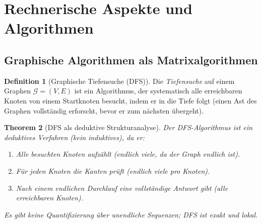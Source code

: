 \documentclass[12pt, a4paper]{article}
\newtheorem{theorem}{Theorem}[section]
\theoremstyle{definition}
\newtheorem{definition}[theorem]{Definition}
\theoremstyle{remark}
\newcommand{\Graph}{\mathcal{G}}
\begin{document}
\section{Rechnerische Aspekte und Algorithmen}
\label{sec:algorithmen}

\subsection{Graphische Algorithmen als Matrixalgorithmen}
\label{subsec:graphische_algorithmen}

\begin{definition}[Graphische Tiefensuche (DFS)]
\label{def:dfs}
Die \emph{Tiefensuche} auf einem Graphen $\Graph = (V, E)$ ist ein Algorithmus, der systematisch alle erreichbaren Knoten von einem Startknoten besucht, indem er in die Tiefe folgt (einen Ast des Graphen vollständig erforscht, bevor er zum nächsten übergeht).
\end{definition}

\begin{theorem}[DFS als deduktive Strukturanalyse]
\label{thm:dfs_deduktiv}
Der DFS-Algorithmus ist ein deduktives Verfahren (kein induktives), da er:
\begin{enumerate}[label=(\alph*)]
  \item Alle besuchten Knoten aufzählt (endlich viele, da der Graph endlich ist).
  \item Für jeden Knoten die Kanten prüft (endlich viele pro Knoten).
  \item Nach einem endlichen Durchlauf eine vollständige Antwort gibt (alle erreichbaren Knoten).
\end{enumerate}

Es gibt keine Quantifizierung über unendliche Sequenzen; DFS ist exakt und lokal.
\end{theorem}
\end{document}

